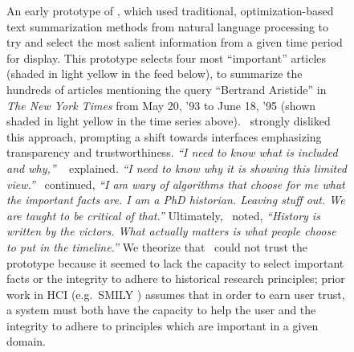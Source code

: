 
\begin{figure}[t!]
\centering
{}
  \caption[Another early prototype of \ours]{
An early prototype of \ours, which used traditional, optimization-based text summarization methods from natural language processing \cite{McDonald} to try and select the most salient information from a given time period for display. This prototype selects four most ``important'' articles (shaded in light yellow in the feed below), to summarize the hundreds of articles mentioning the query ``Bertrand Aristide'' in \textit{The New York Times} from May 20, '93 to June 18, '95 (shown shaded in light yellow in the time series above).
\ifive~strongly disliked this approach, prompting a shift towards interfaces emphasizing transparency and trustworthiness. 
\textit{``I need to know what is included and why,''} \ifive~ explained. \textit{``I need to know why it is showing this limited view.''} \ifive~continued, \textit{``I am wary of algorithms that choose for me what the important facts are. I am a PhD historian. Leaving stuff out. We are taught to be critical of that.''} Ultimately, \ifive~noted, \textit{``History is written by the victors. What actually matters is what people choose to put in the timeline.''} We theorize that \ifive~could not trust the prototype because it seemed to lack the capacity to select important facts or the integrity to adhere to historical research principles; prior work in HCI (e.g.\ SMILY \cite{smiley}) assumes that in order to earn user trust, a system must both have the capacity to help the user and the integrity to adhere to principles which are important in a given domain.
}\label{f:prototype1}
\end{figure}
